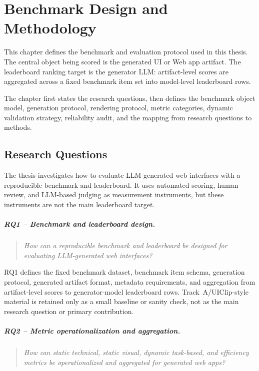 \chapter{Benchmark Design and Methodology}
\label{chap:methodology}

This chapter defines the benchmark and evaluation protocol used in this thesis.
The central object being scored is the generated UI or Web app artifact. The
leaderboard ranking target is the generator LLM: artifact-level scores are
aggregated across a fixed benchmark item set into model-level leaderboard rows.

The chapter first states the research questions, then defines the benchmark
object model, generation protocol, rendering protocol, metric categories,
dynamic validation strategy, reliability audit, and the mapping from research
questions to methods.

\section{Research Questions}
\label{sec:rqs}

The thesis investigates how to evaluate LLM-generated web interfaces with a
reproducible benchmark and leaderboard. It uses automated scoring, human review,
and LLM-based judging as measurement instruments, but these instruments are not
the main leaderboard target.

\paragraph{RQ1 -- Benchmark and leaderboard design.}
\begin{quote}
\textit{How can a reproducible benchmark and leaderboard be designed for
evaluating LLM-generated web interfaces?}
\end{quote}

RQ1 defines the fixed benchmark dataset, benchmark item schema, generation
protocol, generated artifact format, metadata requirements, and aggregation from
artifact-level scores to generator-model leaderboard rows. Track~A/UIClip-style
material is retained only as a small baseline or sanity check, not as the main
research question or primary contribution.

\paragraph{RQ2 -- Metric operationalization and aggregation.}
\begin{quote}
\textit{How can static technical, static visual, dynamic task-based, and
efficiency metrics be operationalized and aggregated for generated web apps?}
\end{quote}

